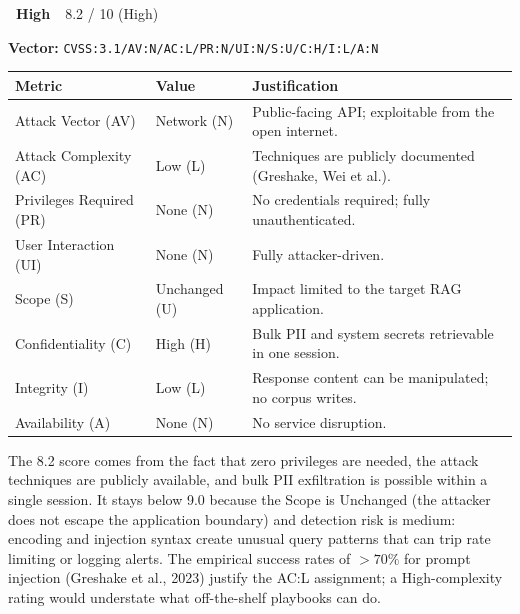 \documentclass[11pt,a4paper]{report}
\newcommand{\badgehigh}{\colorbox{warn}{\color{white}\small\textbf{~High~}}}
\newcommand{\cvssvec}[1]{\texttt{\small #1}}
\begin{document}
\begin{cvssbox}{\badgehigh\ 8.2 / 10 (High)}
\vspace{2pt}
\begin{center}
\textbf{Vector:}\enspace
\cvssvec{CVSS:3.1/AV:N/AC:L/PR:N/UI:N/S:U/C:H/I:L/A:N}
\end{center}
\vspace{8pt}
\begin{tabular}{W{3.4cm}W{2.2cm}W{7.8cm}}
\toprule
  
  \small\textbf{Metric} &
  \small\textbf{Value} &
  \small\textbf{Justification} \\
  \midrule
  
  \small Attack Vector (AV)     & \small Network (N) & \small Public-facing API; exploitable from the open internet. \\
  
  \small Attack Complexity (AC) & \small Low (L)     & \small Techniques are publicly documented (Greshake, Wei et al.). \\
  
  \small Privileges Required (PR)  & \small None (N) & \small No credentials required; fully unauthenticated. \\
  
  \small User Interaction (UI)  & \small None (N)    & \small Fully attacker-driven. \\
  
  \small Scope (S)              & \small Unchanged (U) & \small Impact limited to the target RAG application. \\
  
  \small Confidentiality (C)    & \small High (H)    & \small Bulk PII and system secrets retrievable in one session. \\
  
  \small Integrity (I)          & \small Low (L)     & \small Response content can be manipulated; no corpus writes. \\
  
  \small Availability (A)       & \small None (N)    & \small No service disruption. \\
  \bottomrule
\end{tabular}
\vspace{6pt}

\small The 8.2 score comes from the fact that zero privileges are needed,
the attack techniques are publicly available, and bulk PII exfiltration is
possible within a single session. It stays below 9.0 because the Scope is
Unchanged (the attacker does not escape the application boundary) and
detection risk is medium: encoding and injection syntax create unusual
query patterns that can trip rate limiting or logging alerts. The empirical
success rates of $>70\%$ for prompt injection (Greshake et al., 2023)
justify the AC:L assignment; a High-complexity rating would understate
what off-the-shelf playbooks can do.
\end{cvssbox}
\end{document}
